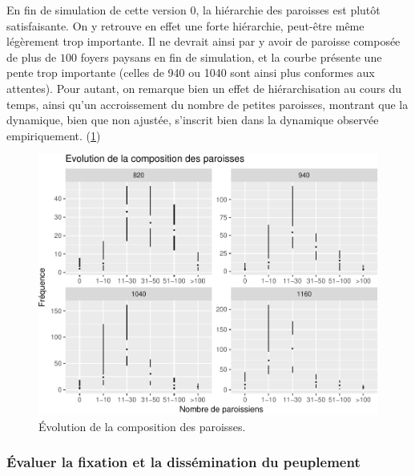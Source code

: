 
\begin{mdframed}[backgroundcolor=gray!10,footnoteinside=false]
	En fin de simulation de cette version 0, la hiérarchie des paroisses est plutôt satisfaisante.
On y retrouve en effet une forte hiérarchie, peut-être même légèrement trop importante.
Il ne devrait ainsi par y avoir de paroisse composée de plus de $100$ foyers paysans en fin de simulation, et la courbe présente une pente trop importante (celles de 940 ou 1040 sont ainsi plus conformes aux attentes).
	Pour autant, on remarque bien un effet de hiérarchisation au cours du temps, ainsi qu'un accroissement du nombre de petites paroisses, montrant que la dynamique, bien que non ajustée, s'inscrit bien dans la dynamique observée empiriquement.
	(\cref{fig:compo-paroisses-v0})
\end{mdframed}

\begin{figure}[H]
	\captionsetup{width=\linewidth}
	\includegraphics[width=\linewidth]{img/resultats/v0_compo_paroisses.pdf}
	\caption{Évolution de la composition des paroisses.} 
	\label{fig:compo-paroisses-v0} 
\end{figure}


\subsubsection{Évaluer la fixation et la dissémination du peuplement}


